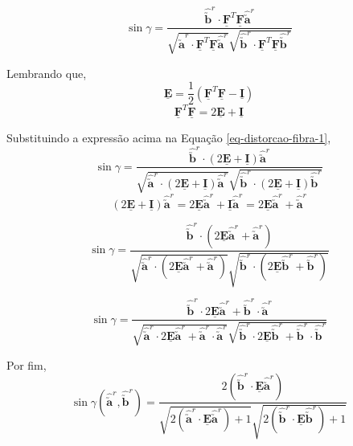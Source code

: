 	\begin{equation}\label{eq-distorcao-fibra-1}
		\sin\gamma=\frac{\hat{\utilde{\mathbf{b}}}^r\cdot\underline{\mathbf{F}}^T\underline{\mathbf{F}}\hat{\utilde{\mathbf{a}}}^r}{\sqrt{\hat{\utilde{\mathbf{a}}}^r\cdot\underline{\mathbf{F}}^T\underline{\mathbf{F}}\hat{\utilde{\mathbf{a}}}^r}\sqrt{\hat{\utilde{\mathbf{b}}}^r\cdot\underline{\mathbf{F}}^T\underline{\mathbf{F}}\hat{\utilde{\mathbf{b}}}^r}}
	\end{equation}		

	Lembrando que,
	\[\underline{\mathbf{E}}=\frac{1}{2}(\underline{\mathbf{F}}^T\underline{\mathbf{F}}-\underline{\mathbf{I}})\]
	\[\underline{\mathbf{F}}^T\underline{\mathbf{F}}=2\underline{\mathbf{E}}+\underline{\mathbf{I}}\]
	
	Substituindo a expressão acima na Equação \eqref{eq-distorcao-fibra-1},
	\[\sin\gamma=\frac{\hat{\utilde{\mathbf{b}}}^r\cdot(2\underline{\mathbf{E}}+\underline{\mathbf{I}})\hat{\utilde{\mathbf{a}}}^r}{\sqrt{\hat{\utilde{\mathbf{a}}}^r\cdot(2\underline{\mathbf{E}}+\underline{\mathbf{I}})\hat{\utilde{\mathbf{a}}}^r}\sqrt{\hat{\utilde{\mathbf{b}}}^r\cdot(2\underline{\mathbf{E}}+\underline{\mathbf{I}})\hat{\utilde{\mathbf{b}}}^r}}\]
	\[(2\underline{\mathbf{E}}+\underline{\mathbf{I}})\hat{\utilde{\mathbf{a}}}^r=2\underline{\mathbf{E}}\hat{\utilde{\mathbf{a}}}^r+\underline{\mathbf{I}}\hat{\utilde{\mathbf{a}}}^r=2\underline{\mathbf{E}}\hat{\utilde{\mathbf{a}}}^r+\hat{\utilde{\mathbf{a}}}^r\]
	
	\[\sin\gamma=\frac{\hat{\utilde{\mathbf{b}}}^r\cdot(2\underline{\mathbf{E}}\hat{\utilde{\mathbf{a}}}^r+\hat{\utilde{\mathbf{a}}}^r)}{\sqrt{\hat{\utilde{\mathbf{a}}}^r\cdot(2\underline{\mathbf{E}}\hat{\utilde{\mathbf{a}}}^r+\hat{\utilde{\mathbf{a}}}^r)}\sqrt{\hat{\utilde{\mathbf{b}}}^r\cdot(2\underline{\mathbf{E}}\hat{\utilde{\mathbf{b}}}^r+\hat{\utilde{\mathbf{b}}}^r)}}\]
	
	\[\sin\gamma=\frac{\hat{\utilde{\mathbf{b}}}^r\cdot2\underline{\mathbf{E}}\hat{\utilde{\mathbf{a}}}^r+\hat{\utilde{\mathbf{b}}}^r\cdot\hat{\utilde{\mathbf{a}}}^r}{\displaystyle\sqrt{\hat{\utilde{\mathbf{a}}}^r\cdot2\underline{\mathbf{E}}\hat{\utilde{\mathbf{a}}}^r+\hat{\utilde{\mathbf{a}}}^r\cdot\hat{\utilde{\mathbf{a}}}^r}\sqrt{\hat{\utilde{\mathbf{b}}}^r\cdot2\underline{\mathbf{E}}\hat{\utilde{\mathbf{b}}}^r+\hat{\utilde{\mathbf{b}}}^r\cdot\hat{\utilde{\mathbf{b}}}^r}}\]
	
	Por fim,
	\begin{equation}\label{eq-distorcao-fibra-2}
		\sin\gamma(\hat{\utilde{\mathbf{a}}}^r,\hat{\utilde{\mathbf{b}}}^r)=\frac{2(\hat{\utilde{\mathbf{b}}}^r\cdot\underline{\mathbf{E}}\hat{\utilde{\mathbf{a}}}^r)}{\displaystyle\sqrt{2(\hat{\utilde{\mathbf{a}}}^r\cdot\underline{\mathbf{E}}\hat{\utilde{\mathbf{a}}}^r)+1}\sqrt{2(\hat{\utilde{\mathbf{b}}}^r\cdot\underline{\mathbf{E}}\hat{\utilde{\mathbf{b}}}^r)+1}}
	\end{equation}
	
